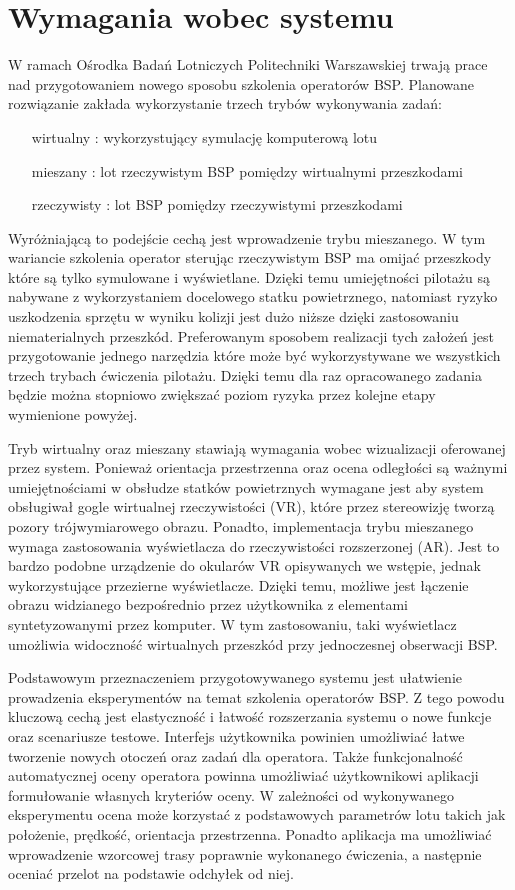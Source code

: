 \newpage
\section{Wymagania wobec systemu}
W ramach Ośrodka Badań Lotniczych Politechniki Warszawskiej trwają prace nad przygotowaniem nowego sposobu szkolenia operatorów BSP. Planowane rozwiązanie zakłada wykorzystanie trzech trybów wykonywania zadań:
\begin{enumerate}
  \item[wirtualny]: wykorzystujący symulację komputerową lotu
  \item[mieszany]: lot rzeczywistym BSP pomiędzy wirtualnymi przeszkodami
  \item[rzeczywisty]: lot BSP pomiędzy rzeczywistymi przeszkodami
\end{enumerate}
Wyróżniającą to podejście cechą jest wprowadzenie trybu mieszanego. W tym wariancie szkolenia operator sterując rzeczywistym BSP ma omijać przeszkody które są tylko symulowane i wyświetlane. Dzięki temu umiejętności pilotażu są nabywane z wykorzystaniem docelowego statku powietrznego, natomiast ryzyko uszkodzenia sprzętu w wyniku kolizji jest dużo niższe dzięki zastosowaniu niematerialnych przeszkód. Preferowanym sposobem realizacji tych założeń jest przygotowanie jednego narzędzia które może być wykorzystywane we wszystkich trzech trybach ćwiczenia pilotażu. Dzięki temu dla raz opracowanego zadania będzie można stopniowo zwiększać poziom ryzyka przez kolejne etapy wymienione powyżej.

Tryb wirtualny oraz mieszany stawiają wymagania wobec wizualizacji oferowanej przez system. Ponieważ orientacja przestrzenna oraz ocena odległości są ważnymi umiejętnościami w obsłudze statków powietrznych wymagane jest aby system obsługiwał gogle wirtualnej rzeczywistości (VR), które przez stereowizję tworzą pozory trójwymiarowego obrazu. Ponadto, implementacja trybu mieszanego wymaga zastosowania wyświetlacza do rzeczywistości rozszerzonej (AR). Jest to bardzo podobne urządzenie do okularów VR opisywanych we wstępie, jednak wykorzystujące przezierne wyświetlacze. Dzięki temu, możliwe jest łączenie obrazu widzianego bezpośrednio przez użytkownika z elementami syntetyzowanymi przez komputer. W tym zastosowaniu, taki wyświetlacz umożliwia widoczność wirtualnych przeszkód przy jednoczesnej obserwacji BSP.

Podstawowym przeznaczeniem przygotowywanego systemu jest ułatwienie prowadzenia eksperymentów na temat szkolenia operatorów BSP. Z tego powodu kluczową cechą jest elastyczność i łatwość rozszerzania systemu o nowe funkcje oraz scenariusze testowe. Interfejs użytkownika powinien umożliwiać łatwe tworzenie nowych otoczeń oraz zadań dla operatora. Także funkcjonalność automatycznej oceny operatora powinna umożliwiać użytkownikowi aplikacji formułowanie własnych kryteriów oceny. W zależności od wykonywanego eksperymentu ocena może korzystać z podstawowych parametrów lotu takich jak położenie, prędkość, orientacja przestrzenna. Ponadto aplikacja ma umożliwiać wprowadzenie wzorcowej trasy poprawnie wykonanego ćwiczenia, a następnie oceniać przelot na podstawie odchyłek od niej.

